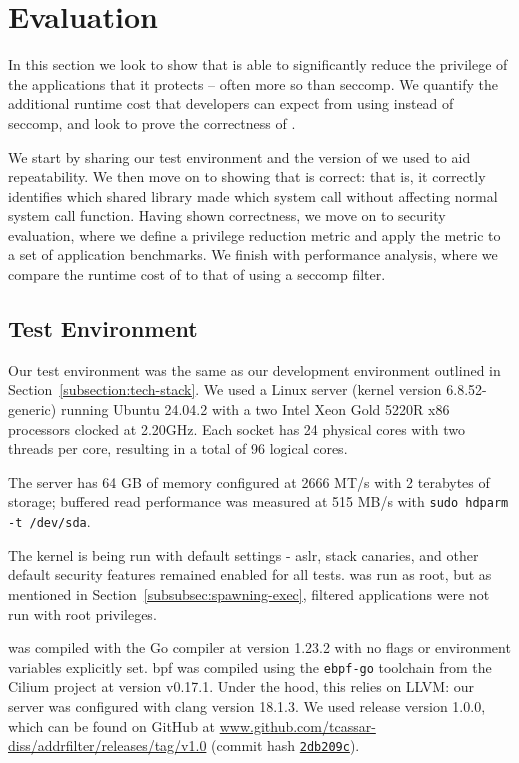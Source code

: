 \section{Evaluation}\label{sec:evaluation}

In this section we look to show that \af is able to significantly reduce the
privilege of the applications that it protects -- often more so than seccomp. 
We quantify the additional runtime cost that developers can expect from using 
\af  instead of seccomp, and look to prove the correctness of \af.

We start by sharing our test environment and the version of \af we used to
aid repeatability. We then move on to showing that \af is correct: that
is, it correctly identifies which shared library made which system call without
affecting normal system call function. Having shown correctness, we move on to
security evaluation, where we define a privilege reduction metric and apply the
metric to a set of application benchmarks. We finish with performance analysis,
where we compare the runtime cost of \af to that of using a seccomp filter.

\subsection{Test Environment}

Our test environment was the same as our development environment outlined in
Section~\ref{subsection:tech-stack}. We used a Linux server (kernel version
6.8.52-generic) running Ubuntu 24.04.2 with a two Intel Xeon
Gold 5220R x86 processors clocked at 2.20GHz. Each socket has 24 physical 
cores with two threads per core, resulting in a total of 96 logical cores.

The server has 64 GB of memory configured at 2666 MT/s with 2 terabytes
of storage; buffered read performance was measured at 515 MB/s with 
\texttt{sudo hdparm -t /dev/sda}.

The kernel is being run with default settings - \ac{aslr}, stack
canaries, and other default security features remained enabled for all tests.
\af was run as root, but as mentioned in Section~\ref{subsubsec:spawning-exec},
filtered applications were not run with root privileges.

\af was compiled with the Go compiler at version 1.23.2 with no flags or
environment variables explicitly set. \ac{bpf} was
compiled using the \texttt{ebpf-go} toolchain from the Cilium project at version
v0.17.1. Under the hood, this relies on LLVM: our server was configured with
clang version 18.1.3. We used \af release version 1.0.0, which can be found on
GitHub at
\href{https://github.com/tcassar-diss/addrfilter/releases/tag/v1.0}
{www.github.com/tcassar-diss/addrfilter/releases/tag/v1.0}
(commit hash 
\href{https://github.com/tcassar-diss/addrfilter/tree/2bd209c630df3509d4ac721d018dabab94305dde}
{\texttt{2db209c}}).

